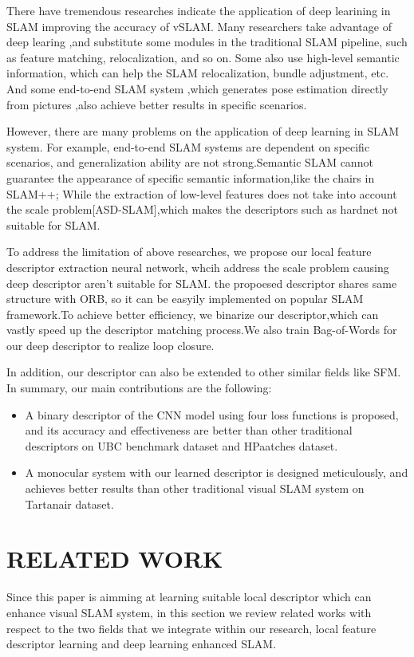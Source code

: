 \documentclass[conference]{IEEEtran}
\begin{document}
There have tremendous researches indicate the application of deep learining in SLAM improving the accuracy of vSLAM. Many researchers take advantage of deep learing ,and substitute some modules in the traditional SLAM pipeline, such as feature matching, relocalization, and so on. Some also use high-level semantic information, which can help the SLAM relocalization, bundle adjustment, etc. And some end-to-end SLAM system  ,which generates pose estimation directly from pictures ,also achieve better results in specific scenarios.

However, there are many problems on the application of deep learning in SLAM system. For example, end-to-end SLAM systems are dependent on specific scenarios, and generalization ability are not strong.Semantic SLAM cannot guarantee the  appearance of specific semantic information,like the chairs in SLAM++; While the extraction of low-level features does not take into account the scale problem[ASD-SLAM],which makes the descriptors such as hardnet not suitable for SLAM.

To address the limitation of above researches, we propose our local feature descriptor extraction neural network, whcih address the scale problem causing deep descriptor aren't suitable for SLAM. the propoesed descriptor shares same structure with ORB, so it can be  easyily implemented on popular SLAM framework.To achieve better efficiency, we binarize our descriptor,which can vastly speed up the descriptor matching process.We also train Bag-of-Words for our deep descriptor to realize loop closure. 

In addition, our descriptor can also be extended to other similar fields like SFM. In summary, our main contributions are the following:
\begin{itemize}
\item A binary descriptor of the CNN model using  four loss functions is proposed, and its accuracy and effectiveness are better than other traditional descriptors on UBC benchmark dataset and HPaatches dataset.
\item A monocular system with our learned descriptor is designed meticulously, and achieves better results than other traditional visual SLAM system on Tartanair dataset.
\end{itemize}

\section{RELATED WORK}
Since this paper is aimming at learning suitable local descriptor which can enhance visual SLAM system, in this section we review related works with respect to the two fields that we integrate within our research, local feature descriptor learning and deep learning enhanced SLAM.
\end{document}
